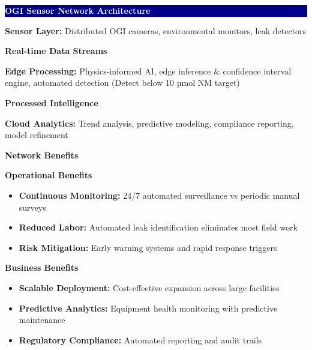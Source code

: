 \documentclass[11pt,a4paper]{article}
\begin{document}
\newpage

\colorbox{darkblue}{\parbox{\textwidth}{\centering\textcolor{white}{\textbf{OGI Sensor Network Architecture}}}}

\vspace{0.3cm}

\textbf{Sensor Layer:} Distributed OGI cameras, environmental monitors, leak detectors

\begin{center}
\textbf{Real-time Data Streams}
\end{center}

\textbf{Edge Processing:} Physics-informed AI, edge inference \& confidence interval engine, automated detection (Detect below 10 µmol NM target)

\begin{center}
\textbf{Processed Intelligence}
\end{center}

\textbf{Cloud Analytics:} Trend analysis, predictive modeling, compliance reporting, model refinement

\vspace{0.3cm}

\begin{minipage}{0.48\textwidth}
\textbf{Network Benefits}

\textbf{Operational Benefits}
\begin{itemize}[leftmargin=*,itemsep=0pt]
\item \textbf{Continuous Monitoring:} 24/7 automated surveillance vs periodic manual surveys
\item \textbf{Reduced Labor:} Automated leak identification eliminates most field work
\item \textbf{Risk Mitigation:} Early warning systems and rapid response triggers
\end{itemize}
\end{minipage}
\hfill
\begin{minipage}{0.48\textwidth}
\textbf{Business Benefits}
\begin{itemize}[leftmargin=*,itemsep=0pt]
\item \textbf{Scalable Deployment:} Cost-effective expansion across large facilities
\item \textbf{Predictive Analytics:} Equipment health monitoring with predictive maintenance
\item \textbf{Regulatory Compliance:} Automated reporting and audit trails
\end{itemize}
\end{minipage}
\end{document}
